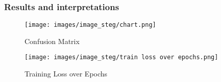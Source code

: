 \documentclass[12pt]{article}
\begin{document}
\subsubsection{Results and interpretations}
\begin{figure}[H]
    \centering
    \begin{minipage}[b]{0.48\textwidth}
        \centering
        \texttt{[image: images/image\_steg/chart.png]}
        \caption{Confusion Matrix}
    \end{minipage}
    \hfill
    \begin{minipage}[b]{0.48\textwidth}
        \centering
        \texttt{[image: images/image\_steg/train loss over epochs.png]}
        \caption{Training Loss over Epochs}
    \end{minipage}
\end{figure}
\end{document}
